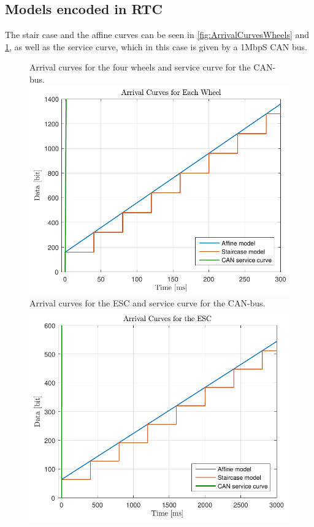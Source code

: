\subsection{Models encoded in RTC}
The stair case and the affine curves can be seen in \autoref{fig:ArrivalCurvesWheels} and \ref{fig:ArrivalCurvesESC}, as well as the service curve, which in this case is given by a 1MbpS CAN bus. 
%
\begin{figure}[H]
	\captionbox
	{
		Arrival curves for the four wheels and service curve for the CAN-bus.
		\label{fig:ArrivalCurvesWheels}
	}
	{
		\includegraphics[width=.4\textwidth]{figures/ArrivalCurvesWheels}
	}
	\hspace{5pt}
	\captionbox
	{
		Arrival curves for the ESC and service curve for the CAN-bus.
		\label{fig:ArrivalCurvesESC}
	}
	{
		\includegraphics[width=.4\textwidth]{figures/ArrivalCurvesESC}
	}
\end{figure}